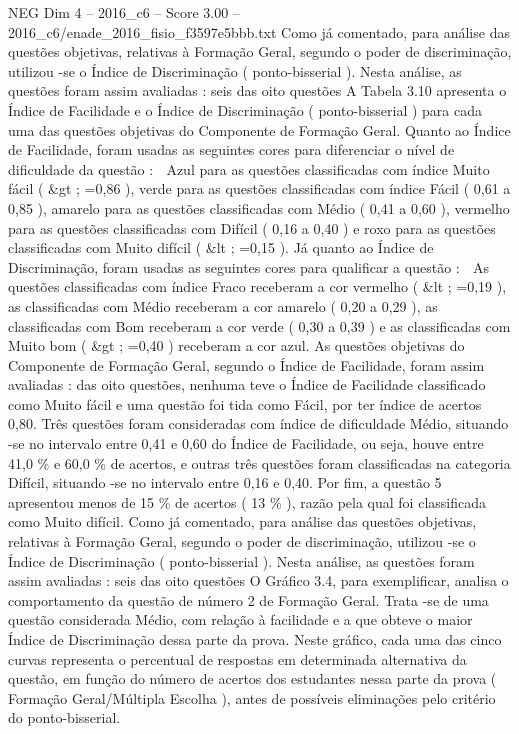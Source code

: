 \begin{textsample}{NEG Dim 4 – 2016\_c6 – Score 3.00 – 2016\_c6/enade\_2016\_fisio\_f3597e5bbb.txt}
Como já comentado, para análise das questões objetivas, relativas à Formação Geral, segundo o poder de discriminação, utilizou -se o Índice de Discriminação ( ponto-bisserial ).
Nesta análise, as questões foram assim avaliadas : seis das oito questões A Tabela 3.10 apresenta o Índice de Facilidade e o Índice de Discriminação ( ponto-bisserial ) para cada uma das questões objetivas do Componente de Formação Geral.
Quanto ao Índice de Facilidade, foram usadas as seguintes cores para diferenciar o nível de dificuldade da questão :  Azul para as questões classificadas com índice Muito fácil ( \&gt ; =0,86 ), verde para as questões classificadas com índice Fácil ( 0,61 a 0,85 ), amarelo para as questões classificadas com Médio ( 0,41 a 0,60 ), vermelho para as questões classificadas com Difícil ( 0,16 a 0,40 ) e roxo para as questões classificadas com Muito difícil ( \&lt ; =0,15 ).
Já quanto ao Índice de Discriminação, foram usadas as seguintes cores para qualificar a questão :  As questões classificadas com índice Fraco receberam a cor vermelho ( \&lt ; =0,19 ), as classificadas com Médio receberam a cor amarelo ( 0,20 a 0,29 ), as classificadas com Bom receberam a cor verde ( 0,30 a 0,39 ) e as classificadas com Muito bom ( \&gt ; =0,40 ) receberam a cor azul.
As questões objetivas do Componente de Formação Geral, segundo o Índice de Facilidade, foram assim avaliadas : das oito questões, nenhuma teve o Índice de Facilidade classificado como Muito fácil e uma questão foi tida como Fácil, por ter índice de acertos 0,80.
Três questões foram consideradas com índice de dificuldade Médio, situando -se no intervalo entre 0,41 e 0,60 do Índice de Facilidade, ou seja, houve entre 41,0 \% e 60,0 \% de acertos, e outras três questões foram classificadas na categoria Difícil, situando -se no intervalo entre 0,16 e 0,40.
Por fim, a questão 5 apresentou menos de 15 \% de acertos ( 13 \% ), razão pela qual foi classificada como Muito difícil.
Como já comentado, para análise das questões objetivas, relativas à Formação Geral, segundo o poder de discriminação, utilizou -se o Índice de Discriminação ( ponto-bisserial ).
Nesta análise, as questões foram assim avaliadas : seis das oito questões O Gráfico 3.4, para exemplificar, analisa o comportamento da questão de número 2 de Formação Geral.
Trata -se de uma questão considerada Médio, com relação à facilidade e a que obteve o maior Índice de Discriminação dessa parte da prova.
Neste gráfico, cada uma das cinco curvas representa o percentual de respostas em determinada alternativa da questão, em função do número de acertos dos estudantes nessa parte da prova ( Formação Geral/Múltipla Escolha ), antes de possíveis eliminações pelo critério do ponto-bisserial.

\end{textsample}
